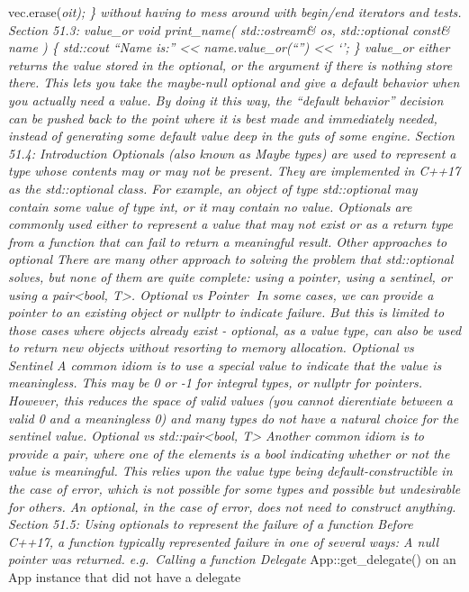 vec.erase(\emph{oit); \} without having to mess around with begin/end
iterators and tests. Section 51.3: value\_or void print\_name(
std::ostream\& os, std::optional const\& name ) \{ std::cout ``Name
is:'' \textless\textless{} name.value\_or(``'') \textless\textless{}
`\n'; \} value\_or either returns the value stored in the optional, or
the argument if there is nothing store there. This lets you take the
maybe-null optional and give a default behavior when you actually need a
value. By doing it this way, the ``default behavior'' decision can be
pushed back to the point where it is best made and immediately needed,
instead of generating some default value deep in the guts of some
engine. Section 51.4: Introduction Optionals (also known as Maybe types)
are used to represent a type whose contents may or may not be present.
They are implemented in C++17 as the std::optional class. For example,
an object of type std::optional may contain some value of type int, or
it may contain no value. Optionals are commonly used either to represent
a value that may not exist or as a return type from a function that can
fail to return a meaningful result. Other approaches to optional There
are many other approach to solving the problem that std::optional
solves, but none of them are quite complete: using a pointer, using a
sentinel, or using a pair\textless bool, T\textgreater. Optional vs
Pointer In some cases, we can provide a pointer to an existing object
or nullptr to indicate failure. But this is limited to those cases where
objects already exist - optional, as a value type, can also be used to
return new objects without resorting to memory allocation. Optional vs
Sentinel A common idiom is to use a special value to indicate that the
value is meaningless. This may be 0 or -1 for integral types, or nullptr
for pointers. However, this reduces the space of valid values (you
cannot dierentiate between a valid 0 and a meaningless 0) and many types
do not have a natural choice for the sentinel value. Optional vs
std::pair\textless bool, T\textgreater{} Another common idiom is to
provide a pair, where one of the elements is a bool indicating whether
or not the value is meaningful. This relies upon the value type being
default-constructible in the case of error, which is not possible for
some types and possible but undesirable for others. An optional, in the
case of error, does not need to construct anything. Section 51.5: Using
optionals to represent the failure of a function Before C++17, a
function typically represented failure in one of several ways: A null
pointer was returned. e.g.~Calling a function Delegate
}App::get\_delegate() on an App instance that did not have a delegate
